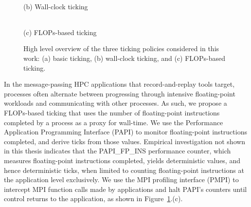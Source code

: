 \begin{figure}[!htb]
\begin{minipage}{0.33\textwidth}
    \\ (b) Wall-clock ticking
    \end{minipage}%
    \begin{minipage}{0.33\textwidth}
        \\ (c) FLOPs-based ticking
    \end{minipage}%
    \label{fig:ticking_policies}
    \caption{High level overview of the three ticking policies
      considered in this work: (a) basic ticking, (b) wall-clock
      ticking, and (c) FLOPs-based ticking.}
\end{figure}

In the message-passing HPC applications that record-and-replay tools
target, processes often alternate between progressing through
intensive floating-point workloads and communicating with other
processes. As such, we propose a FLOPs-based ticking that uses the
number of floating-point instructions completed by a process as a
proxy for wall-time. We use the Performance Application Programming
Interface (PAPI) to monitor floating-point instructions completed, and
derive ticks from those values.  Empirical investigation not shown in
this thesis indicates that the PAPI\_FP\_INS performance counter,
which measures floating-point instructions completed, yields
deterministic values, and hence deterministic ticks, when limited to
counting floating-point instructions at the application level
exclusively.  We use the MPI profiling interface (PMPI) to intercept
MPI function calls made by applications and halt PAPI's counters until
control returns to the application, as shown in
Figure~\ref{fig:ticking_policies}.(c).
 
